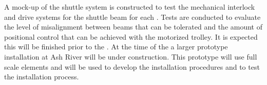 A mock-up of the shuttle system is constructed to test the
mechanical interlock and drive systems for the shuttle beam
for each .  Tests are conducted to evaluate the level of
misalignment between beams that can be tolerated and the amount of
positional control that can be achieved with the motorized trolley. It
is expected this will be finished prior to the . At the time of the
 a larger prototype installation at Ash River will be under
construction. This prototype will use full scale elements and will be
used to develop the installation procedures and to test the
 installation process.
